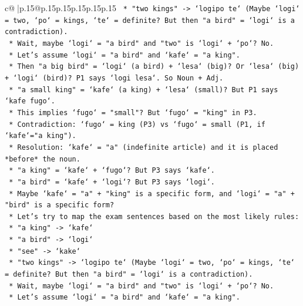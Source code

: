 \documentclass{article}
\begin{document}
{\begin{supertabular}{c@{$\;$}|p{.15\linewidth}@{}p{.15\linewidth}p{.15\linewidth}p{.15\linewidth}p{.15\linewidth}p{.15\linewidth}}
{{{\texttt{                    *   "two kings" {-}> `logipo te` (Maybe `logi` = two, `po` = kings, `te` = definite? But then "a bird" = `logi` is a contradiction).} \\
\texttt{                    *   Wait, maybe `logi` = "a bird" and "two" is `logi` + `po`? No.} \\
\texttt{                    *   Let's assume `logi` = "a bird" and `kafe` = "a king".} \\
\texttt{                    *   Then "a big bird" = `logi` (a bird) + `lesa` (big)? Or `lesa` (big) + `logi` (bird)? P1 says `logi lesa`. So Noun + Adj.} \\
\texttt{                    *   "a small king" = `kafe` (a king) + `lesa` (small)? But P1 says `kafe fugo`.} \\
\texttt{                    *   This implies `fugo` = "small"? But `fugo` = "king" in P3.} \\
\texttt{                    *   Contradiction: `fugo` = king (P3) vs `fugo` = small (P1, if `kafe`="a king").} \\
\texttt{                    *   Resolution: `kafe` = "a" (indefinite article) and it is placed *before* the noun.} \\
\texttt{                        *   "a king" = `kafe` + `fugo`? But P3 says `kafe`.} \\
\texttt{                        *   "a bird" = `kafe` + `logi`? But P3 says `logi`.} \\
\texttt{                    *   Maybe `kafe` = "a" + "king" is a specific form, and `logi` = "a" + "bird" is a specific form?} \\
\texttt{                    *   Let's try to map the exam sentences based on the most likely rules:} \\
\texttt{                        *   "a king" {-}> `kafe`} \\
\texttt{                        *   "a bird" {-}> `logi`} \\
\texttt{                        *   "see" {-}> `kake`} \\
\texttt{                        *   "two kings" {-}> `logipo te` (Maybe `logi` = two, `po` = kings, `te` = definite? But then "a bird" = `logi` is a contradiction).} \\
\texttt{                        *   Wait, maybe `logi` = "a bird" and "two" is `logi` + `po`? No.} \\
\texttt{                        *   Let's assume `logi` = "a bird" and `kafe` = "a king".} \\
}}}
\end{supertabular}}
\end{document}
